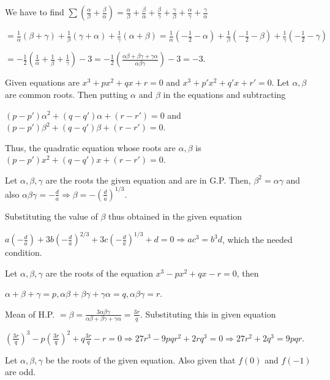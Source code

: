   We have to find $\displaystyle\sum\left(\frac{\alpha}{\beta} + \frac{\beta}{\alpha}\right) =
  \frac{\alpha}{\beta} + \frac{\beta}{\alpha} + \frac{\beta}{\gamma} + \frac{\gamma}{\beta} +
  \frac{\alpha}{\gamma} + \frac{\gamma}{\alpha}$

  $=\frac{1}{\alpha}(\beta + \gamma) + \frac{1}{\beta}(\gamma + \alpha) + \frac{1}{\gamma}(\alpha + \beta) =
  \frac{1}{\alpha}\left(-\frac{1}{2} - \alpha\right) + \frac{1}{\beta}\left(-\frac{1}{2} - \beta\right) +
  \frac{1}{\gamma}\left(-\frac{1}{2} - \gamma\right)$

  $= -\frac{1}{2}\left(\frac{1}{\alpha} + \frac{1}{\beta} + \frac{1}{\gamma}\right) - 3=
  -\frac{1}{2}\left(\frac{\alpha\beta + \beta\gamma + \gamma\alpha}{\alpha\beta\gamma}\right) - 3 = -3$.
\item Given equations are $x^3 + px^2 + qx + r = 0$ and $x^3 + p'x^2 + q'x + r' = 0$. Let $\alpha, \beta$
  are common roots. Then putting $\alpha$ and $\beta$ in the equations and subtracting

  $(p - p')\alpha^2 + (q - q')\alpha + (r - r') = 0$ and $(p - p')\beta^2 + (q - q')\beta + (r - r') = 0$.

  Thus, the quadratic equation whose roots are $\alpha, \beta$ is $(p - p')x^2 + (q - q')x + (r - r') = 0$.
\item Let $\alpha, \beta, \gamma$ are the roots the given equation and are in G.P. Then, $\beta^2 =
  \alpha\gamma$ and also $\alpha\beta\gamma = -\frac{d}{a} \Rightarrow \beta =
  -\left(\frac{d}{a}\right)^{1/3}$.

  Substituting the value of $\beta$ thus obtained in the given equation

  $a\left(-\frac{d}{a}\right) + 3b\left(-\frac{d}{a}\right)^{2/3} + 3c\left(-\frac{d}{a}\right)^{1/3} + d =
  0\Rightarrow ac^3 = b^3d$, which the needed condition.
\item Let $\alpha, \beta, \gamma$ are the roots of the equation $x^3 - px^2 + qx - r = 0$, then

  $\alpha + \beta + \gamma = p, \alpha\beta + \beta\gamma + \gamma\alpha = q, \alpha\beta\gamma = r$.

  Mean of H.P. $= \beta = \frac{3\alpha\beta\gamma}{\alpha\beta + \beta\gamma + \gamma\alpha} =
  \frac{3r}{q}$. Substituting this in given equation

  $\left(\frac{3r}{q}\right)^3 - p\left(\frac{3r}{q}\right)^2 + q\frac{3r}{q} - r = 0 \Rightarrow 27r^3 -
  9pqr^2 + 2rq^3 = 0 \Rightarrow 27r^2 + 2q^3 = 9pqr$.
\item Let $\alpha, \beta, \gamma$ be the roots of the given equation. Also given that $f(0)$ and $f(-1)$ are
  odd.

